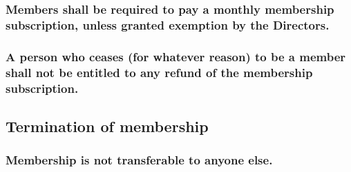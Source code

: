 \documentclass[12pt]{article}
\begin{document}
\subsubsection{Members shall be required to pay a monthly membership subscription, unless granted exemption by the Directors.}
\subsubsection{A person who ceases (for whatever reason) to be a member shall not be entitled to any refund of the membership subscription.}

\subsection{Termination of membership}
\subsubsection{Membership is not transferable to anyone else.}
\end{document}
